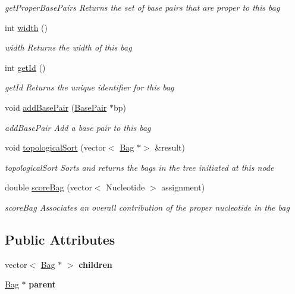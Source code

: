 \begin{DoxyCompactItemize}
\begin{DoxyCompactList}\small\item\em get\+Proper\+Base\+Pairs Returns the set of base pairs that are proper to this bag \end{DoxyCompactList}\item 
int \hyperlink{class_bag_a4f6d2ad2b6a5e8f23520b2cda13f32ee}{width} ()
\begin{DoxyCompactList}\small\item\em width Returns the width of this bag \end{DoxyCompactList}\item 
int \hyperlink{class_bag_a7d77eb7e82f14c3266a979e08e0001e9}{get\+Id} ()
\begin{DoxyCompactList}\small\item\em get\+Id Returns the unique identifier for this bag \end{DoxyCompactList}\item 
void \hyperlink{class_bag_a4c761d7fd126ff850069bc2d584c511e}{add\+Base\+Pair} (\hyperlink{class_base_pair}{Base\+Pair} $\ast$bp)
\begin{DoxyCompactList}\small\item\em add\+Base\+Pair Add a base pair to this bag \end{DoxyCompactList}\item 
void \hyperlink{class_bag_a736149a37eb50ff5c3905a2a6c757240}{topological\+Sort} (vector$<$ \hyperlink{class_bag}{Bag} $\ast$$>$ \&result)
\begin{DoxyCompactList}\small\item\em topological\+Sort Sorts and returns the bags in the tree initiated at this node \end{DoxyCompactList}\item 
double \hyperlink{class_bag_aab06a56e08bd48cdce2e72d3b56d19f5}{score\+Bag} (vector$<$ Nucleotide $>$ assignment)
\begin{DoxyCompactList}\small\item\em score\+Bag Associates an overall contribution of the proper nucleotide in the bag \end{DoxyCompactList}\end{DoxyCompactItemize}
\subsection*{Public Attributes}
\begin{DoxyCompactItemize}
\item 
\mbox{\label{class_bag_abdc39a5165388baacc11496be14e109a}} 
vector$<$ \hyperlink{class_bag}{Bag} $\ast$ $>$ {\bfseries children}
\item 
\mbox{\label{class_bag_ae747ceb7a33dd7eb16357d20acb2bc79}} 
\hyperlink{class_bag}{Bag} $\ast$ {\bfseries parent}
\end{DoxyCompactItemize}


